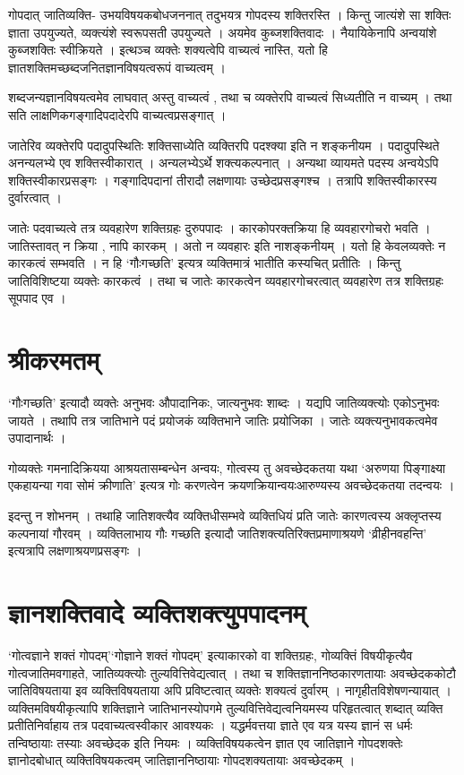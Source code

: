गोपदात् जातिव्यक्ति- उभयविषयकबोधजननात् तदुभयत्र गोपदस्य शक्तिरस्ति । किन्तु जात्यंशे सा शक्तिः ज्ञाता उपयुज्यते, व्यक्त्यंशे स्वरूपसती उपयुज्यते । अयमेव कुब्जशक्तिवादः । नैयायिकेनापि अन्वयांशे कुब्जशक्तिः स्वीक्रियते । इत्थञ्च व्यक्तेः शक्यत्वेपि वाच्यत्वं नास्ति, यतो हि ज्ञातशक्तिमच्छब्दजनितज्ञानविषयत्वरूपं वाच्यत्वम् । 

शब्दजन्यज्ञानविषयत्वमेव लाघवात् अस्तु वाच्यत्वं , तथा च व्यक्तेरपि वाच्यत्वं       सिध्यतीति न वाच्यम् । तथा सति लाक्षणिकगङ्गादिपदादेरपि वाच्यत्वप्रसङ्गात् । 

जातेरिव व्यक्तेरपि पदादुपस्थितिः शक्तिसाध्येति व्यक्तिरपि पदश्क्या इति न शङ्कनीयम । पदादुपस्थिते अनन्यलभ्ये एव शक्तिस्वीकारात् । अन्यलभ्येऽर्थे शक्त्यकल्पनात् । अन्यथा व्यायमते पदस्य अन्वयेऽपि शक्तिस्वीकारप्रसङ्गः । गङ्गादिपदानां तीरादौ लक्षणायाः उच्छेदप्रसङ्गश्च । तत्रापि शक्तिस्वीकारस्य दुर्वारत्वात् ।

जातेः पदवाच्यत्वे तत्र व्यवहारेण  शक्तिग्रहः दुरुपपादः । कारकोपरक्तक्रिया हि व्यवहारगोचरो भवति । जातिस्तावत् न क्रिया , नापि कारकम् । अतो न व्यवहारः इति नाशङ्कनीयम् । यतो हि केवलव्यक्तेः न कारकत्वं सम्भवति । न हि ‘गौःगच्छति’ इत्यत्र व्यक्तिमात्रं भातीति कस्यचित् प्रतीतिः । किन्तु जातिविशिष्टया व्यक्तेः कारकत्वं । तथा च जातेः कारकत्वेन व्यवहारगोचरत्वात् व्यवहारेण तत्र शक्तिग्रहः सूपपाद एव ।

\section*{श्रीकरमतम्}

‘गौःगच्छति’ इत्यादौ व्यक्तेः अनुभवः औपादानिकः, जात्यनुभवः शाब्दः । यद्यपि जातिव्यक्त्योः एकोऽनुभवः जायते । तथापि तत्र जातिभाने पदं प्रयोजकं व्यक्तिभाने जातिः प्रयोजिका । जातेः व्यक्त्यनुभावकत्वमेव उपादानार्थः ।

गोव्यक्तेः गमनादिक्रियया आश्रयतासम्बन्धेन अन्वयः, गोत्वस्य तु अवच्छेदकतया यथा ‘अरुणया पिङ्गाक्ष्या एकहायन्या गवा सोमं क्रीणाति’ इत्यत्र गोः करणत्वेन क्रयणक्रियान्वयःआरुण्यस्य अवच्छेदकतया तदन्वयः ।

इदन्तु न शोभनम् । तथाहि जातिशक्त्यैव व्यक्तिधीसम्भवे व्यक्तिधियं प्रति जातेः कारणत्वस्य अक्लृप्तस्य कल्पनायां गौरवम् । व्यक्तिलाभाय गौः गच्छति इत्यादौ जातिशक्त्यतिरिक्तप्रमाणाश्रयणे ‘व्रीहीनवहन्ति’ इत्यत्रापि लक्षणाश्रयणप्रसङ्गः । 

\section*{ज्ञानशक्तिवादे व्यक्तिशक्त्युपपादनम्}

‘गोत्वज्ञाने शक्तं गोपदम्’‘गोज्ञाने शक्तं गोपदम्’ इत्याकारको वा शक्तिग्रहः, गोव्यक्तिं विषयीकृत्यैव गोत्वजातिमवगाहते, जातिव्यक्त्योः      तुल्यवित्तिवेद्यत्वात् । तथा च शक्तिज्ञाननिष्ठकारणतायाः अवच्छेदककोटौ जातिविषयताया इव व्यक्तिविषयताया अपि प्रविष्टत्वात् व्यक्तेः शक्यत्वं दुर्वारम् । नागृहीतविशेषणन्यायात् । व्यक्तिमविषयीकृत्यापि शक्तिज्ञाने जातिभानस्योपगमे तुल्यवित्तिवेद्यत्वनियमस्य परिहृतत्वात् शब्दात् व्यक्ति प्रतीतिनिर्वाहाय तत्र पदवाच्यत्वस्वीकार आवश्यकः । यद्धर्मवत्तया ज्ञाते एव यत्र यस्य ज्ञानं    स धर्मः तन्विष्ठायाः तस्याः अवच्छेदक इति नियमः । व्यक्तिविषयकत्वेन ज्ञात एव जातिज्ञाने गोपदशक्तेः ज्ञानोदबोधात् व्यक्तिविषयकत्वम् जातिज्ञाननिष्ठायाः गोपदशक्यतायाः अवच्छेदकम् । 

